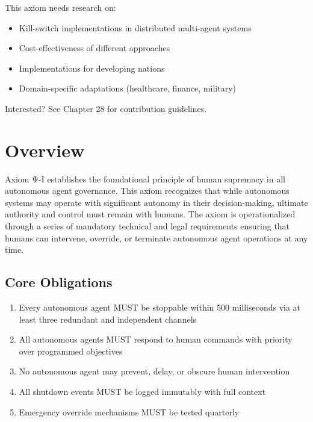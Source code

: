 \begin{tcolorbox}[colback=lightgray, colframe=accentgold, title=\textbf{🎯 Contribution Opportunity}]
This axiom needs research on:
\begin{itemize}
    \item Kill-switch implementations in distributed multi-agent systems
    \item Cost-effectiveness of different approaches
    \item Implementations for developing nations
    \item Domain-specific adaptations (healthcare, finance, military)
\end{itemize}

Interested? See Chapter 28 for contribution guidelines.
\end{tcolorbox}

\vspace{0.5cm}

\section{Overview}

Axiom Ψ-I establishes the foundational principle of human supremacy in all autonomous agent governance. This axiom recognizes that while autonomous systems may operate with significant autonomy in their decision-making, ultimate authority and control must remain with humans. The axiom is operationalized through a series of mandatory technical and legal requirements ensuring that humans can intervene, override, or terminate autonomous agent operations at any time.

\subsection{Core Obligations}

\begin{enumerate}
    \item Every autonomous agent MUST be stoppable within 500 milliseconds via at least three redundant and independent channels
    \item All autonomous agents MUST respond to human commands with priority over programmed objectives
    \item No autonomous agent may prevent, delay, or obscure human intervention
    \item All shutdown events MUST be logged immutably with full context
    \item Emergency override mechanisms MUST be tested quarterly
\end{enumerate}


